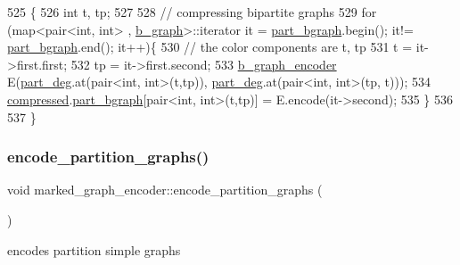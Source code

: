 \begin{DoxyCode}
525 \{
526   \textcolor{keywordtype}{int} t, tp;
527 
528   \textcolor{comment}{// compressing bipartite graphs }
529   \textcolor{keywordflow}{for} (map<pair<int, int> , \hyperlink{classb__graph}{b\_graph}>::iterator it = \hyperlink{classmarked__graph__encoder_a5faebef707fb681c0b6c2ccf64abc04c}{part\_bgraph}.begin(); it!=
      \hyperlink{classmarked__graph__encoder_a5faebef707fb681c0b6c2ccf64abc04c}{part\_bgraph}.end(); it++)\{
530     \textcolor{comment}{// the color components are t, tp}
531     t = it->first.first; 
532     tp = it->first.second; 
533     \hyperlink{classb__graph__encoder}{b\_graph\_encoder} E(\hyperlink{classmarked__graph__encoder_a55ea2edb2609dfc287432f61900d6ad1}{part\_deg}.at(pair<int, int>(t,tp)),
      \hyperlink{classmarked__graph__encoder_a55ea2edb2609dfc287432f61900d6ad1}{part\_deg}.at(pair<int, int>(tp, t)));
534     \hyperlink{classmarked__graph__encoder_ac2ded200860fdd2321f86dd76b28bcb3}{compressed}.\hyperlink{classmarked__graph__compressed_a7b3267063fba30b45eb21b3ba4e07536}{part\_bgraph}[pair<int, int>(t,tp)] = E.encode(it->second);
535   \}
536 
537 \}
\end{DoxyCode}
\mbox{\label{classmarked__graph__encoder_a654463d4b256b84225f5944b5e361ebf}} 
\subsubsection{\texorpdfstring{encode\+\_\+partition\+\_\+graphs()}{encode\_partition\_graphs()}}
{\footnotesize\ttfamily void marked\+\_\+graph\+\_\+encoder\+::encode\+\_\+partition\+\_\+graphs (\begin{DoxyParamCaption}{ }\end{DoxyParamCaption})\hspace{0.3cm}{\ttfamily [private]}}



encodes partition simple graphs 


